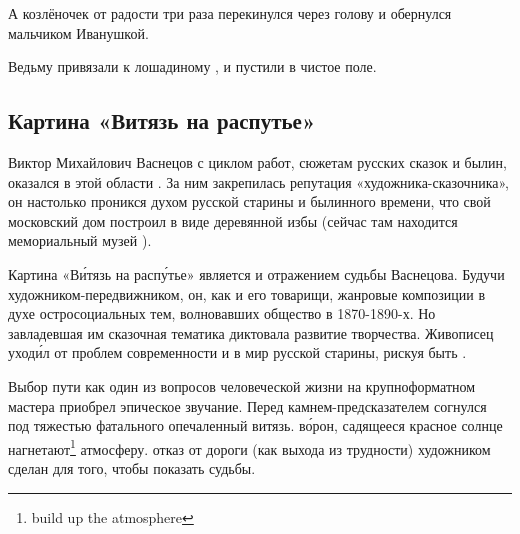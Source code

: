 А козлёночек от радости три раза перекинулся через голову и обернулся мальчиком Иванушкой.

Ведьму привязали к лошадиному , и пустили в чистое поле.


\subsection{Картина «Витязь на распутье»}

Виктор Михайлович Васнецов с циклом работ,  сюжетам русских сказок и былин, оказался  в этой области . За ним закрепилась репутация «художника-сказочника», он настолько проникся духом русской старины и былинного времени, что свой московский дом построил в виде деревянной избы (сейчас там находится мемориальный музей ).

Картина «В\'{и}тязь на расп\'{у}тье»  является и отражением судьбы Васнецова.
Будучи  художником-передвижником, он, как и его товарищи,  жанровые композиции в духе остросоциальных тем, волновавших общество в 1870-1890-х.
Но завладевшая им сказочная тематика диктовала  развитие творчества. Живописец уход\'{и}л от проблем современности и  в мир русской старины, рискуя быть .

Выбор пути как один из  вопросов человеческой жизни на крупноформатном  мастера приобрел эпическое звучание.
Перед камнем-предсказателем согнулся под тяжестью фатального  опечаленный витязь.  в\'{о}рон, садящееся красное солнце нагнетают\footnote{build up the atmosphere} атмосферу.  отказ от  дороги (как выхода из трудности) художником сделан для того, чтобы показать  судьбы.